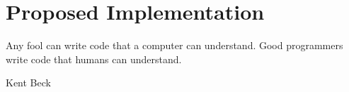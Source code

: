 \chapter{Proposed Implementation}
\label{capitolo5}

\epigraph{Any fool can write code that a computer can understand. Good programmers write code that humans can understand.
}{Kent Beck}

\noindent {}
